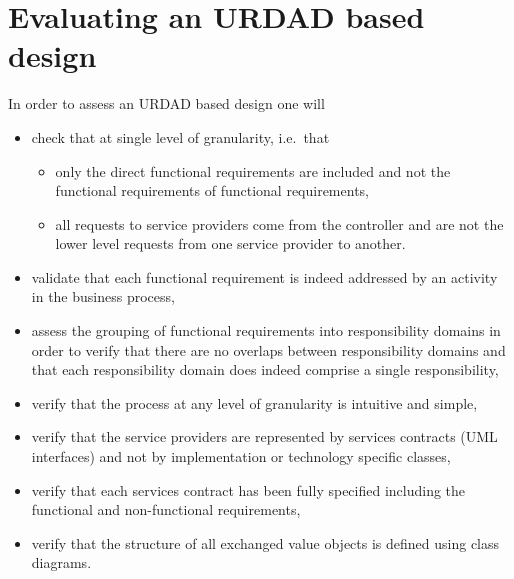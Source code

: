 \section{Evaluating an URDAD based design}

In order to assess an URDAD based design one will
\begin{itemize}
   \item check that at single level of granularity, i.e.\ that
   \begin{itemize}
		\item only the direct functional requirements are included and not the functional requirements
				of functional requirements,
		\item all requests to service providers come from the controller and are not the lower level
				requests from one service provider to another.
   \end{itemize}
   \item validate that each functional requirement is indeed addressed by an activity in the business process,
   \item assess the grouping of functional requirements into responsibility domains in
             order to verify that there are no overlaps between responsibility domains and that
             each responsibility domain does indeed comprise a single responsibility,
    \item verify that the process at any level of granularity is intuitive and simple,
    \item verify that the service providers are represented by services contracts (UML interfaces) and 
              not by implementation or technology specific classes,
    \item verify that each services contract has been fully specified including the functional and
              non-functional requirements,
    \item verify that the structure of all exchanged value objects is defined using class diagrams.
\end{itemize}    
